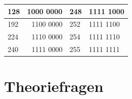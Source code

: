 \documentclass{article}
\begin{document}
\begin{table}[!h]
	\centering
	\begin{tabular}{|l|r|l|l|}
		\hline
		128 & \multicolumn{1}{l|}{1000 0000} & 248 & 1111 1000 \\ \hline
		192 & 1100 0000                      & 252 & 1111 1100 \\ \hline
		224 & 1110 0000                      & 254 & 1111 1110 \\ \hline
		240 & 1111 0000                      & 255 & 1111 1111 \\ \hline
	\end{tabular}
\end{table}

\newpage
\section{Theoriefragen}
\end{document}
